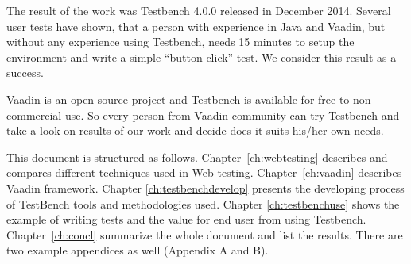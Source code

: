 	  The result of the work was Testbench 4.0.0 released in December 2014.
	  Several user tests have shown, that a person with experience in Java and
	  Vaadin, but without any experience using Testbench, needs 15 minutes to setup
	  the environment and write a simple ``button-click'' test. We consider this
	  result as a success.
	  
	  Vaadin is an open-source project and Testbench is available for free to
	  non-commercial use.  So every person from Vaadin community can try Testbench and take a look on results of our work and
	   decide does it suits his/her own needs.
	  
	  \iffalse
		  I will also , because Testbench is focused on testing web
		 applications written with Vaadin. I will also describe the working flow, what
		 tools and methodologies the team used and how the final product helps
		 Vaadin developers.
	  \fi
	  
	  This document is structured as follows. Chapter~\ref{ch:webtesting} describes
	  and compares different techniques used in Web testing. Chapter~\ref{ch:vaadin} describes Vaadin framework.
	  Chapter \ref{ch:testbenchdevelop} presents the developing process of TestBench tools and methodologies used. Chapter
	  \ref{ch:testbenchuse} shows the example of writing tests and the value for
	  end user from using Testbench. Chapter~\ref{ch:concl} summarize the whole
	  document and list the results. There are two example appendices as well (Appendix A and B).
